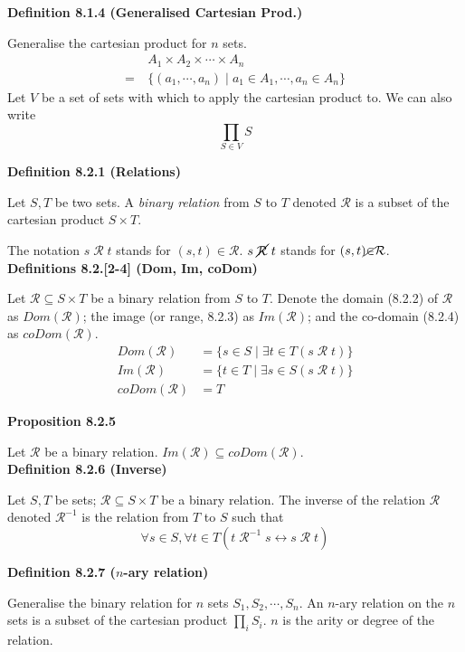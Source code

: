 \documentclass[a4paper]{article}
\newcommand{\subheading}[1]{{\scriptsize\textbf{#1}}}
\begin{document}
\begin{multicols*}{4}
\subheading{Definition 8.1.4 (Generalised Cartesian Prod.)}

Generalise the cartesian product for $n$ sets.
\begin{align*}
&A_1 \times A_2 \times \cdots \times A_n \\
  =\ &\{(a_1,\cdots,a_n)\;|\;a_1 \in A_1, \cdots, a_n \in A_n\}
\end{align*}
Let $V$ be a set of sets with which to apply the cartesian product to. We can
also write
$$\prod_{S \in V} S$$

\subheading{Definition 8.2.1 (Relations)}

Let $S, T$ be two sets. A \textit{binary relation} from $S$ to $T$ denoted
$\mathcal{R}$ is a subset of the cartesian product $S \times T$.

The notation $s\; \mathcal{R}\; t$ stands for $(s, t) \in \mathcal{R}$. $s\;
\cancel{\mathcal{R}}\; t$ stands for $(s, t) \cancel{\in} \mathcal{R}$.\\

\subheading{Definitions 8.2.[2-4] (Dom, Im, coDom)}

Let $\mathcal{R} \subseteq S \times T$ be a binary relation from $S$ to $T$.
Denote the domain (8.2.2) of $\mathcal{R}$ as $Dom(\mathcal{R})$; the image (or
range, 8.2.3) as $Im(\mathcal{R})$; and the co-domain (8.2.4) as
$coDom(\mathcal{R})$.
\begin{align*}
  Dom(\mathcal{R}) &= \{s \in S\;|\; \exists t \in T (s\;\mathcal{R}\;t)\} \\
  Im(\mathcal{R})  &= \{t \in T\;|\; \exists s \in S (s\;\mathcal{R}\;t)\} \\
  coDom(\mathcal{R}) &= T
\end{align*}

\subheading{Proposition 8.2.5}

Let $\mathcal{R}$ be a binary relation. $Im(\mathcal{R}) \subseteq
coDom(\mathcal{R})$. \\

\subheading{Definition 8.2.6 (Inverse)}

Let $S, T$ be sets; $\mathcal{R} \subseteq S \times T$ be a binary relation. The
inverse of the relation $\mathcal{R}$ denoted $\mathcal{R}^{-1}$ is the relation
from $T$ to $S$ such that
$$\forall s \in S, \forall t \in T
  (t\;\mathcal{R}^{-1}\;s \longleftrightarrow s\;\mathcal{R}\;t)$$

\subheading{Definition 8.2.7 ($n$-ary relation)}

Generalise the binary relation for $n$ sets $S_1, S_2, \cdots, S_n$. An $n$-ary
relation on the $n$ sets is a subset of the cartesian product $\prod_{i} S_i$.
$n$ is the arity or degree of the relation.\\


\end{multicols*}
\end{document}
